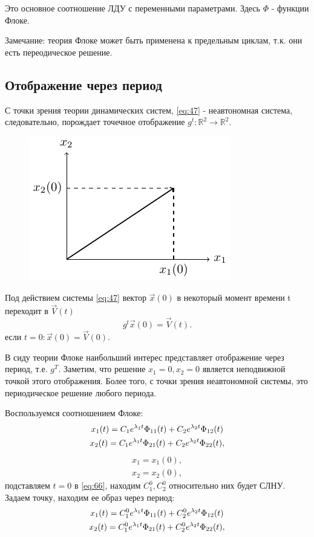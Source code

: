 Это основное соотношение ЛДУ с переменными параметрами. Здесь $\Phi$ - функции Флоке. 

Замечание: теория Флоке может быть применена к предельным циклам, т.к. они есть переодическое решение. 
\subsection{Отображение через период}
С точки зрения теории динамических систем, \eqref{eq:47} - неавтономная система, следовательно, порождает точечное отображение $g^t:\mathds{R}^2\rightarrow \mathds{R}^2$.
\begin{figure}[H]
	\centering
	\includegraphics[width=0.35\linewidth]{fig/fig33.pdf}   
\end{figure}

Под действием системы \eqref{eq:47} вектор $\vec{x}(0)$ в некоторый момент времени t переходит в $\vec{V}(t)$
\begin{equation*}
	g^t\vec{x}(0)=\vec{V}(t).
\end{equation*}
если $t=0: \vec{x}(0)=\vec{V}(0)$.

В сиду теории Флоке наибольший интерес представляет отображение через период, т.е. $g^T$. Заметим, что решение $x_1=0, x_2=0$ является неподвижной точкой этого отображения. Более того, с точки зрения неавтономной системы, это периодическое решение любого периода. 

Воспользуемся соотношением Флоке:
\begin{gather}
	x_1(t)=C_1 e^{\lambda_1 t}\Phi_{11}(t)+C_2 e^{\lambda_2 t}\Phi_{12}(t) \notag \\ 
	x_2(t)=C_1 e^{\lambda_1 t}\Phi_{21}(t)+C_2 e^{\lambda_2 t}\Phi_{22}(t),		
	\label{eq:66}
\end{gather}
\begin{gather*}
	x_1=x_1(0), \\ 
	x_2=x_2(0),		
\end{gather*}
подставляем $t=0$ в \eqref{eq:66}, находим $C_1^0, C_2^0$ относительно них будет СЛНУ. Задаем точку, находим ее образ через период:
\begin{gather}
	x_1(t)=C_1^0 e^{\lambda_1 t}\Phi_{11}(t)+C_2^0 e^{\lambda_2 t}\Phi_{12}(t) \notag \\ 
	x_2(t)=C_1^0 e^{\lambda_1 t}\Phi_{21}(t)+C_2^0 e^{\lambda_2 t}\Phi_{22}(t),		
	\label{eq:67}
\end{gather}

